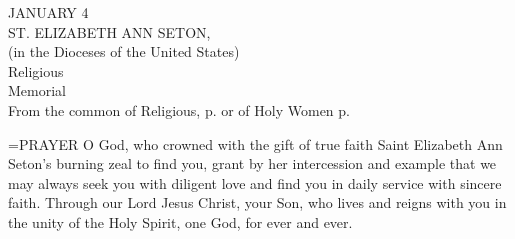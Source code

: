 \begin{center}\normalsize JANUARY 4\\
\footnotesize ST. ELIZABETH ANN SETON, \\
\footnotesize (in the Dioceses of the United States)\\
\footnotesize Religious\\
\footnotesize Memorial\\
\footnotesize From the common of Religious, p.   or of Holy Women p.  \\
\end{center}

\hangindent=\parindent \small{PRAYER 
O God, who crowned with the gift of true faith
Saint Elizabeth Ann Seton’s burning zeal to find you,
grant by her intercession and example
that we may always seek you with diligent love
and find you in daily service with sincere faith.
Through our Lord Jesus Christ, your Son,
who lives and reigns with you in the unity of the Holy Spirit,
one God, for ever and ever.
 \\}
 

